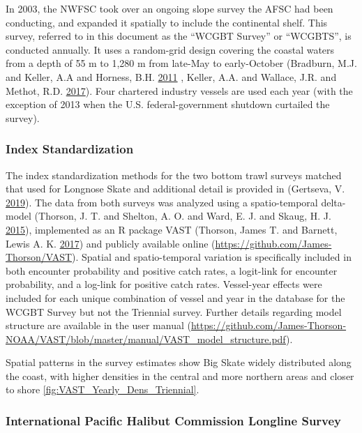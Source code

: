 \documentclass[12pt,]{article}
\begin{document}
In 2003, the NWFSC took over an ongoing slope survey the AFSC had been
conducting, and expanded it spatially to include the continental shelf.
This survey, referred to in this document as the ``WCGBT Survey'' or
``WCGBTS'', is conducted annually. It uses a random-grid design covering
the coastal waters from a depth of 55 m to 1,280 m from late-May to
early-October (Bradburn, M.J. and Keller, A.A and Horness, B.H.
\protect\hyperlink{ref-Bradburn2011}{2011} , Keller, A.A. and Wallace,
J.R. and Methot, R.D. \protect\hyperlink{ref-Keller2017}{2017}). Four
chartered industry vessels are used each year (with the exception of
2013 when the U.S. federal-government shutdown curtailed the survey).

\hypertarget{index-standardization}{%
\subsubsection{Index Standardization}\label{index-standardization}}

The index standardization methods for the two bottom trawl surveys
matched that used for Longnose Skate and additional detail is provided
in (Gertseva, V. \protect\hyperlink{ref-Gertseva2019}{2019}). The data
from both surveys was analyzed using a spatio-temporal delta-model
(Thorson, J. T. and Shelton, A. O. and Ward, E. J. and Skaug, H. J.
\protect\hyperlink{ref-Thorson2015}{2015}), implemented as an R package
VAST (Thorson, James T. and Barnett, Lewis A. K.
\protect\hyperlink{ref-Thorson2017a}{2017}) and publicly available
online (\url{https://github.com/James-Thorson/VAST}). Spatial and
spatio-temporal variation is specifically included in both encounter
probability and positive catch rates, a logit-link for encounter
probability, and a log-link for positive catch rates. Vessel-year
effects were included for each unique combination of vessel and year in
the database for the WCGBT Survey but not the Triennial survey. Further
details regarding model structure are available in the user manual
(\url{https://github.com/James-Thorson-NOAA/VAST/blob/master/manual/VAST_model_structure.pdf}).

Spatial patterns in the survey estimates show Big Skate widely
distributed along the coast, with higher densities in the central and
more northern areas and closer to shore
\ref{fig:VAST_Yearly_Dens_Triennial}.

\hypertarget{international-pacific-halibut-commission-longline-survey}{%
\subsubsection{International Pacific Halibut Commission Longline
Survey}\label{international-pacific-halibut-commission-longline-survey}}
\end{document}
